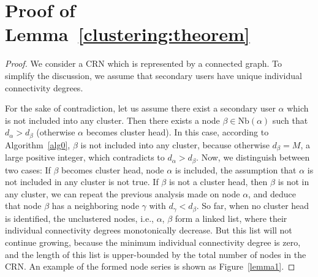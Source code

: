 \documentclass[times]{ettauth}
\newcommand{\ie}{i.e., }
\theoremstyle{mytheoremstyle}
\theoremstyle{mytheoremstyle}
\theoremstyle{mytheoremstyle}
\begin{document}
\section{Proof of Lemma~\ref{clustering:theorem}}
\begin{proof}
\label{proof_clustering:lemma1}
We consider a CRN which is represented by a connected graph.
To simplify the discussion, we assume that secondary users have unique individual connectivity degrees.

For the sake of contradiction, let us assume there exist a secondary user $\alpha$ which is not included into any cluster.
Then there exists a node $\beta\in \text{Nb}(\alpha)$ such that $d_{\alpha} > d_{\beta}$ (otherwise $\alpha$ becomes cluster head). 
In this case, according to Algorithm~\ref{alg0}, $\beta$ is not included into any cluster, because otherwise $d_{\beta} = M$, a large positive integer, which contradicts to $d_{\alpha} > d_{\beta}$.
Now, we distinguish between two cases: 
If $\beta$ becomes cluster head, node $\alpha$ is included, the assumption that $\alpha$ is not included in any cluster is not true.
If $\beta$ is not a cluster head, then $\beta$ is not in any cluster, we can repeat the previous analysis made on node $\alpha$, and deduce that node $\beta$ has a neighboring node $\gamma$ with $d_{\gamma} < d_{\beta}$.
So far, when no cluster head is identified, the unclustered nodes, \ie $\alpha$, $\beta$ form a linked list, where their individual connectivity degrees monotonically decrease.
But this list will not continue growing, because the minimum individual connectivity degree is zero, and the length of this list is upper-bounded by the total number of nodes in the CRN.
An example of the formed node series is shown as Figure~\ref{lemma1}.


\end{proof}
\end{document}
